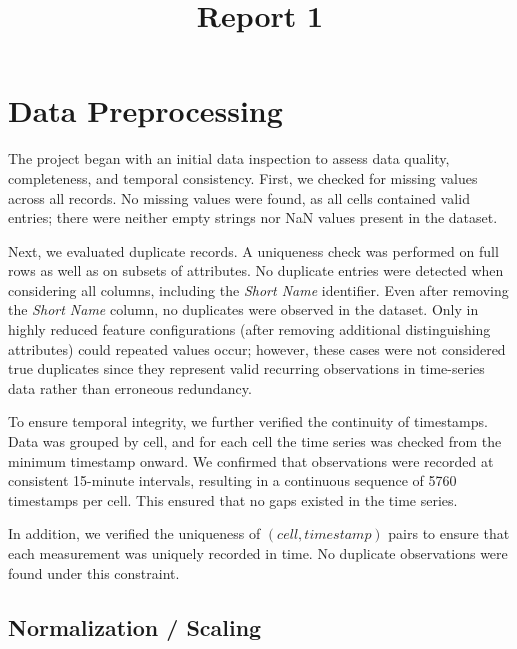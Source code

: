 \documentclass[conference]{IEEEtran}
\begin{document}
\title{Report 1}

\author{
}

\maketitle



\section{Data Preprocessing}

The project began with an initial data inspection to assess data quality, completeness, and temporal consistency. First, we checked for missing values across all records. No missing values were found, as all cells contained valid entries; there were neither empty strings nor NaN values present in the dataset.

Next, we evaluated duplicate records. A uniqueness check was performed on full rows as well as on subsets of attributes. No duplicate entries were detected when considering all columns, including the \textit{Short Name} identifier. Even after removing the \textit{Short Name} column, no duplicates were observed in the dataset. Only in highly reduced feature configurations (after removing additional distinguishing attributes) could repeated values occur; however, these cases were not considered true duplicates since they represent valid recurring observations in time-series data rather than erroneous redundancy.

To ensure temporal integrity, we further verified the continuity of timestamps. Data was grouped by cell, and for each cell the time series was checked from the minimum timestamp onward. We confirmed that observations were recorded at consistent 15-minute intervals, resulting in a continuous sequence of 5760 timestamps per cell. This ensured that no gaps existed in the time series.

In addition, we verified the uniqueness of $(cell, timestamp)$ pairs to ensure that each measurement was uniquely recorded in time. No duplicate observations were found under this constraint.

\subsection{Normalization / Scaling}
\end{document}
